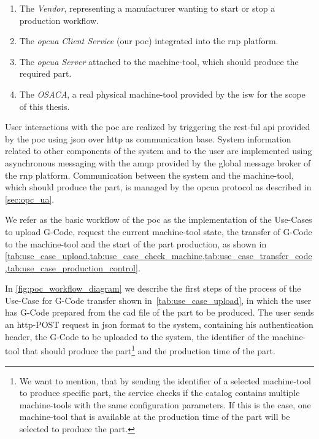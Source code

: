 \documentclass[
a4paper,
twoside,
headsepline,
cleardoublepage=empty,
parskip=half,
draft=false
]{scrbook}
\begin{document}
				\begin{enumerate}
					
					\item The \textit{Vendor}, representing a manufacturer wanting to start or stop a production workflow.
					
					\item The \textit{\gls{opcua} Client Service} (our \gls{poc}) integrated into the \gls{rnp} platform.
					
					\item The \textit{\gls{opcua} Server} attached to the machine-tool, which should produce the required part.
					
					\item The \textit{OSACA}, a real physical machine-tool provided by the \gls{isw} for the scope of this thesis.
					
				\end{enumerate}
				
				User interactions with the \gls{poc} are realized by triggering the \gls{rest}-ful \gls{api} provided by the \gls{poc} using \gls{json} over \gls{http} as communication base.
				System information related to other components of the system and to the user are implemented using asynchronous messaging with the \gls{amqp} provided by the global message broker of the \gls{rnp} platform.
				Communication between the system and the machine-tool, which should produce the part, is managed by the \gls{opcua} protocol as described in \cref{sec:opc_ua}.
				
				We refer as the basic workflow of the \gls{poc} as the implementation of the Use-Cases to upload G-Code, request the current machine-tool state, the transfer of G-Code to the machine-tool and the start of the part production, as shown in \cref{tab:use_case_upload,tab:use_case_check_machine,tab:use_case_transfer_code,tab:use_case_production_control}.

				In \cref{fig:poc_workflow_diagram} we describe the first steps of the process of the Use-Case for G-Code transfer shown in~\cref{tab:use_case_upload}, in which the user has G-Code prepared from the \gls{cad} file of the part to be produced. The user sends an \gls{http}-POST request in \gls{json} format to the system, containing his authentication header, the G-Code to be uploaded to the system, the identifier of the machine-tool that should produce the part\footnote{We want to mention, that by sending the identifier of a selected machine-tool to produce specific part, the service checks if the catalog contains multiple machine-tools with the same configuration parameters. If this is the case, one machine-tool that is available at the production time of the part will be selected to produce the part.} and the production time of the part.
\end{document}
